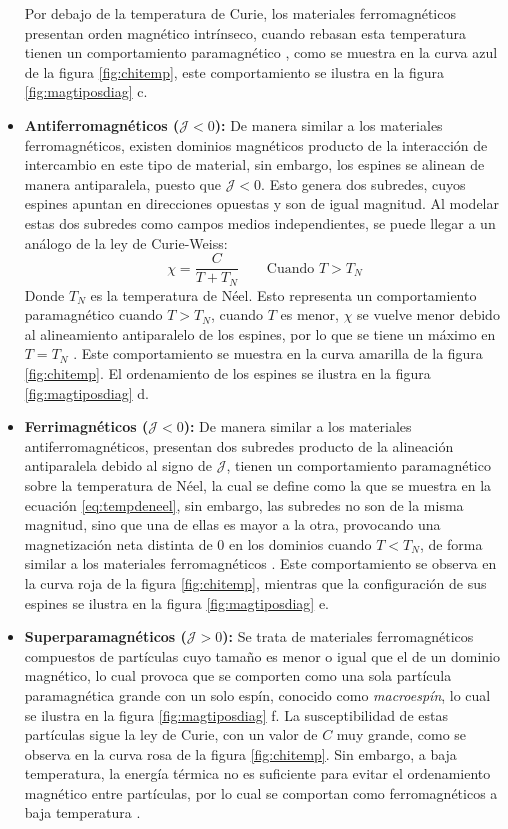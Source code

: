 \documentclass[../main.tex]{subfiles}
\begin{document}
\begin{itemize}
    Por debajo de la temperatura de Curie, los materiales ferromagnéticos presentan orden magnético intrínseco, cuando rebasan esta temperatura tienen un comportamiento paramagnético \cite{coey2010magnetism}, como se muestra en la curva azul de la figura \ref{fig:chitemp}, este comportamiento se ilustra en la figura \ref{fig:magtiposdiag} c.
    \item \textbf{Antiferromagnéticos ($\mathcal{J}<0$):} De manera similar a los materiales ferromagnéticos, existen dominios magnéticos producto de la interacción de intercambio en este tipo de material, sin embargo, los espines se alinean de manera antiparalela, puesto que $\mathcal{J}<0$. Esto genera dos subredes, cuyos espines apuntan en direcciones opuestas y son de igual magnitud. Al modelar estas dos subredes como campos medios independientes, se puede llegar a un análogo de la ley de Curie-Weiss:
    \begin{equation}
        \chi=\dfrac{C}{T+T_N}\qquad\text{Cuando }T>T_N
        \label{eq:tempdeneel}
    \end{equation}
    Donde $T_N$ es la temperatura de Néel. Esto representa un comportamiento paramagnético cuando $T>T_N$, cuando $T$ es menor, $\chi$ se vuelve menor debido al alineamiento antiparalelo de los espines, por lo que se tiene un máximo en $T=T_N$ \cite{coey2010magnetism}. Este comportamiento se muestra en la curva amarilla de la figura \ref{fig:chitemp}. El ordenamiento de los espines se ilustra en la figura \ref{fig:magtiposdiag} d.
    \item \textbf{Ferrimagnéticos ($\mathcal{J}<0$):} De manera similar a los materiales antiferromagnéticos, presentan dos subredes producto de la alineación antiparalela debido al signo de $\mathcal{J}$, tienen un comportamiento paramagnético sobre la temperatura de Néel, la cual se define como la que se muestra en la ecuación \ref{eq:tempdeneel}, sin embargo, las subredes no son de la misma magnitud, sino que una de ellas es mayor a la otra, provocando una magnetización neta distinta de 0 en los dominios cuando $T<T_N$, de forma similar a los materiales ferromagnéticos \cite{coey2010magnetism}. Este comportamiento se observa en la curva roja de la figura \ref{fig:chitemp}, mientras que la configuración de sus espines se ilustra en la figura \ref{fig:magtiposdiag} e.
    \item \textbf{Superparamagnéticos ($\mathcal{J}>0$):} Se trata de materiales ferromagnéticos compuestos de partículas cuyo tamaño es menor o igual que el de un dominio magnético, lo cual provoca que se comporten como una sola partícula paramagnética grande con un solo espín, conocido como \textit{macroespín}, lo cual se ilustra en la figura \ref{fig:magtiposdiag} f. La susceptibilidad de estas partículas sigue la ley de Curie, con un valor de $C$ muy grande, como se observa en la curva rosa de la figura \ref{fig:chitemp}. Sin embargo, a baja temperatura, la energía térmica no es suficiente para evitar el ordenamiento magnético entre partículas, por lo cual se comportan como ferromagnéticos a baja temperatura \cite{coey2010magnetism}.
\end{itemize}
\end{document}
